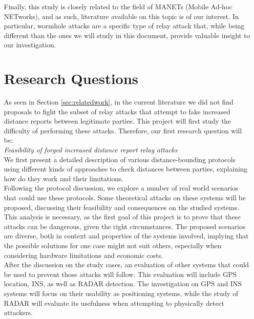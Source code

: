 \documentclass{article}
\begin{document}
Finally, this study is closely related to the field of MANETs (Mobile Ad-hoc NETworks), and as such, literature available on this topic is of our interest. In particular, wormhole attacks \cite{goyal2010literature, hu2006wormhole, maheshwari2007detecting} are a specific type of relay attack that, while being different than the ones we will study in this document, provide valuable insight to our investigation.\\














\section{Research Questions}
\label{sec:researchquestions}

As seen in Section \ref{sec:relatedwork}, in the current literature we did not find proposals to fight the subset of relay attacks that attempt to fake increased distance reports between legitimate parties. This project will first study the difficulty of performing these attacks. Therefore, our first research question will be:\\

\emph{Feasibility of forged increased distance report relay attacks}\\

We first present a detailed description of various distance-bounding protocols using different kinds of approaches to check distances between parties, explaining how do they work and their limitations.\\

Following the protocol discussion, we explore a number of real world scenarios that could use these protocols. Some theoretical attacks on these systems will be proposed, discussing their feasibility and consequences on the studied systems. This analysis is necessary, as the first goal of this project is to prove that these attacks can be dangerous, given the right circumstances. The proposed scenarios are diverse, both in context and properties of the systems involved, implying that the possible solutions for one case might not suit others, especially when considering hardware limitations and economic costs.\\

After the discussion on the study cases, an evaluation of other systems that could be used to prevent those attacks will follow. This evaluation will include GPS location, INS, as well as RADAR detection. The investigation on GPS and INS systems will focus on their usability as positioning systems, while the study of RADAR will evaluate its usefulness when attempting to physically detect attackers.\\
\end{document}
